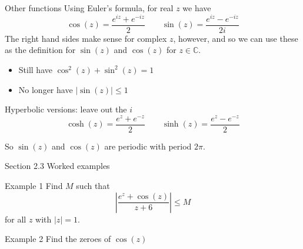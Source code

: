 \documentclass{beamer}
\newcommand{\C}{\mathbb{C}}
\begin{document}
\begin{frame}{Other functions}
Using Euler's formula, for real $z$ we have
$$\cos(z)=\frac{e^{iz}+e^{-iz}}{2} \quad \quad \sin(z)=\frac{e^{iz}-e^{-iz}}{2i}$$
The right hand sides make sense for complex $z$, however, and so we can use these as the definition for $\sin(z)$ and $\cos(z)$ for $z\in\C$.
\begin{itemize}
    \item Still have $\cos^2(z)+\sin^2(z)=1$
    \item No longer have $|\sin(z)|\leq 1$
\end{itemize}
\begin{block}{Hyperbolic versions: leave out the $i$}
$$\cosh(z)=\frac{e^{z}+e^{-z}}{2} \quad \quad \sinh(z)=\frac{e^{z}-e^{-z}}{2}$$
\end{block}
So $\sin(z)$ and $\cos(z)$ are periodic with period $2\pi$.
\end{frame}

\begin{frame}{Section 2.3 Worked examples}
\begin{block}{Example 1}
Find $M$ such that 
$$\left| \frac{e^z+\cos(z)}{z+6}\right| \leq M$$
for all $z$ with $|z|=1$.
\end{block}
\begin{block}{Example 2}
Find the zeroes of $\cos(z)$
\end{block}
\end{frame}
\end{document}
